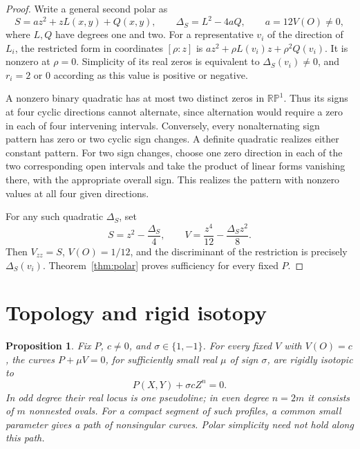\documentclass[11pt,a4paper]{article}
\newtheorem{proposition}[theorem]{Proposition}
\theoremstyle{remark}
\newcommand{\RP}{\mathbb {RP}}
\begin{document}
\begin{proof}
Write a general second polar as
\[
 S=az^2+zL(x,y)+Q(x,y),\qquad
 \Delta_S=L^2-4aQ,\qquad a=12V(O)\ne0,
\]
where \(L,Q\) have degrees one and two. For a representative \(v_i\)
of the direction of \(L_i\), the restricted form in coordinates
\([\rho:z]\) is
\(az^2+\rho L(v_i)z+\rho^2Q(v_i)\).
It is nonzero at \(\rho=0\). Simplicity of its real zeros
is equivalent to \(\Delta_S(v_i)\ne0\), and \(r_i=2\)
or \(0\) according as this value is positive or negative.

A nonzero binary quadratic has at most two distinct zeros in
\(\RP^1\). Thus its signs at four cyclic directions cannot
alternate, since alternation would require a zero in each of
four intervening intervals. Conversely, every nonalternating
sign pattern has zero or two cyclic sign changes. A definite
quadratic realizes either constant pattern. For two sign changes,
choose one zero direction in each of the two corresponding open
intervals and take the product of linear forms vanishing there,
with the appropriate overall sign. This realizes the pattern
with nonzero values at all four given directions.

For any such quadratic \(\Delta_S\), set
\[
                S=z^2-\frac{\Delta_S}{4},\qquad
                V=\frac{z^4}{12}-\frac{\Delta_S z^2}{8}.
\]
Then \(V_{zz}=S\), \(V(O)=1/12\), and the discriminant of
the restriction is precisely \(\Delta_S(v_i)\).
Theorem~\ref{thm:polar} proves sufficiency for every fixed \(P\).
\end{proof}

\section{Topology and rigid isotopy}\label{sec:topology}

\begin{proposition}\label{prop:topology}
Fix \(P\), \(c\ne0\), and \(\sigma\in\{1,-1\}\).
For every fixed \(V\) with \(V(O)=c\), the curves
\(P+\mu V=0\), for sufficiently small real \(\mu\) of sign
\(\sigma\), are rigidly isotopic to
\begin{equation}\label{eq:modelcurve}
                         P(X,Y)+\sigma cZ^n=0.
\end{equation}
In odd degree their real locus is one pseudoline; in even degree
\(n=2m\) it consists of \(m\) nonnested ovals.
For a compact segment of such profiles, a common small parameter
gives a path of nonsingular curves. Polar simplicity need not hold
along this path.
\end{proposition}
\end{document}

